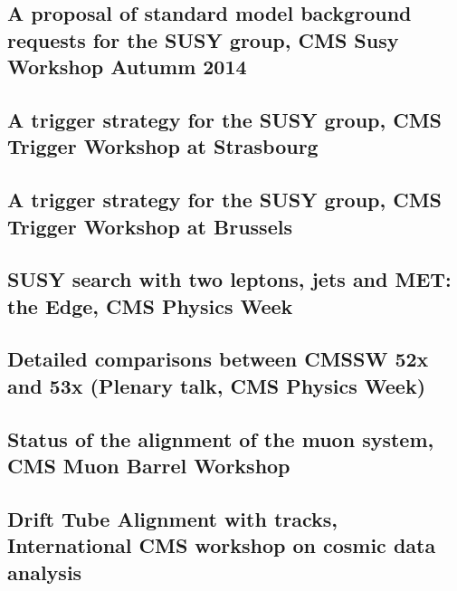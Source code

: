 \documentclass[a4paper, 11pt, twoside, openright]{report}
\begin{document}
\subsection{A proposal of standard model background requests for the SUSY group, CMS Susy Workshop Autumm 2014}


\subsection{A trigger strategy for the SUSY group, CMS Trigger Workshop at Strasbourg}


\subsection{A trigger strategy for the SUSY group, CMS Trigger Workshop at Brussels}


\subsection{SUSY search with two leptons, jets and MET: the Edge, CMS Physics Week}


\subsection{Detailed comparisons between CMSSW 52x and 53x (Plenary talk, CMS Physics Week)}


\subsection{Status of the alignment of the muon system, CMS Muon Barrel Workshop}


\subsection{Drift Tube Alignment with tracks, International CMS workshop on cosmic data analysis}

\end{document}
